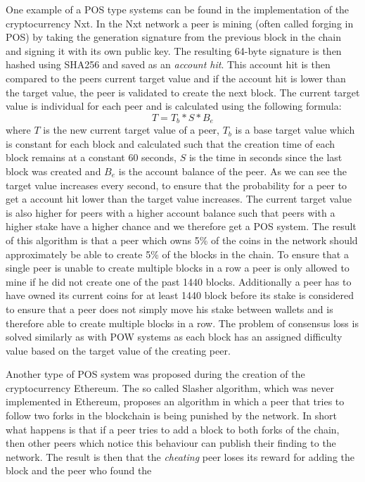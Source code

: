 One example of a POS type systems can be found in the implementation of the cryptocurrency Nxt. 
In the Nxt network a peer is mining (often called forging in POS) by taking the generation signature from the previous block in the chain and signing it with its own public key. The resulting
64-byte signature is then hashed using SHA256 and saved as an \textit{account hit}. This account hit is then compared to the peers current target value and if the account hit is lower than the
target value, the peer is validated to create the next block. The current target value is individual for each peer and is calculated using the following formula: $$T=T_b*S*B_e$$ where $T$
is the new current target value of a peer, $T_b$ is a base target value which is constant for each block and calculated such that the creation time of each block remains at a constant 60
seconds, $S$ is the time in seconds since the last block was created and $B_e$ is the account balance of the peer. As we can see the target value increases every second, to ensure that
the probability for a peer to get a account hit lower than the target value increases. The current target value is also higher for peers with a higher account balance such that peers with a higher
stake have a higher chance and we therefore get a POS system. The result of this algorithm is that a peer which owns 5\% of the coins in the network should approximately be able to create 5\% 
of the blocks
in the chain. To ensure that a single peer is unable to create multiple blocks in a row a peer is only allowed to mine if he did not create one of the past 1440 blocks. Additionally
a peer has to have owned its current coins for at least 1440 block before its stake is considered to ensure that a peer does not simply move his stake between wallets and is therefore able to create
multiple blocks in a row. The problem of consensus loss is solved similarly as with POW systems as each block has an assigned difficulty value based on the target value of the creating peer.\cite{url:nxt}\par
Another type of POS system was proposed during the creation of the cryptocurrency Ethereum. The so called Slasher algorithm, which was never implemented in Ethereum, proposes an algorithm in
which a peer that tries to follow two forks in the blockchain is being punished by the network. In short what happens is that if a peer tries to add a block to both forks of the chain, then
other peers which notice this behaviour can publish their finding to the network. The result is then that the \textit{cheating} peer loses its reward for adding the block and the peer who found the
